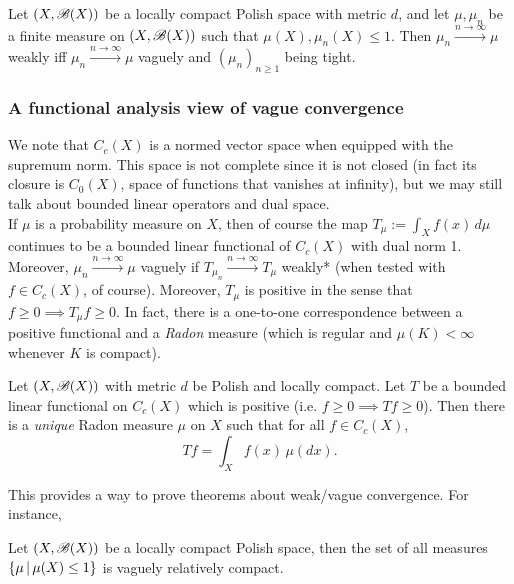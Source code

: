 \begin{unexaminable}
\begin{theorem}
Let $(X,\mathcal{B}(X))$ be a locally compact Polish space with metric $d$, and let $\mu, \mu_n$ be a finite measure on $(X,\mathcal{B}(X))$ such that $\mu(X), \mu_n(X) \leq 1$. Then $\mu_n \overset{n\to\infty}\to \mu$ weakly iff $\mu_n \overset{n\to\infty}\to \mu$ vaguely and $(\mu_n)_{n\geq 1}$ being tight.
\end{theorem}

\subsubsection{A functional analysis view of vague convergence}
We note that $C_c(X)$ is a normed vector space when equipped with the supremum norm. This space is not complete since it is not closed (in fact its closure is $C_0(X)$, space of functions that vanishes at infinity), but we may still talk about bounded linear operators and dual space.\\

If $\mu$ is a probability measure on $X$, then of course the map $T_\mu:= \int_X f(x) \, d\mu$ continues to be a bounded linear functional of $C_c(X)$ with dual norm 1. Moreover, $\mu_n \overset{n\to\infty}{\to} \mu$ vaguely if $T_{\mu_n} \overset{n\to\infty}{\to} T_\mu$ weakly* (when tested with $f \in C_c(X)$, of course). Moreover, $T_\mu$ is positive in the sense that $f\geq 0 \implies T_\mu f \geq 0$. In fact, there is a one-to-one correspondence between a positive functional and a \textit{Radon} measure (which is regular and $\mu(K)<\infty$ whenever $K$ is compact).

\begin{theorem} \label{thm:Riesz_Markov}
Let $(X,\mathcal{B}(X))$ with metric $d$ be Polish and locally compact. Let $T$ be a bounded linear functional on $C_c(X)$ which is positive (i.e. $f \geq 0 \implies Tf \geq 0$). Then there is a \textit{unique} Radon measure $\mu$ on $X$ such that for all $f \in C_c(X)$,
\begin{equation}
Tf = \int_X f(x) \, \mu(dx).
\end{equation}
\end{theorem}

This provides a way to prove theorems about weak/vague convergence. For instance, 
\begin{proposition} \label{prop:Helly_general}
Let $(X,\mathcal{B}(X))$ be a locally compact Polish space, then the set of all measures $\left\{ \mu \,|\, \mu(X) \leq 1 \right \}$ is vaguely relatively compact.
\end{proposition}


\end{unexaminable}
